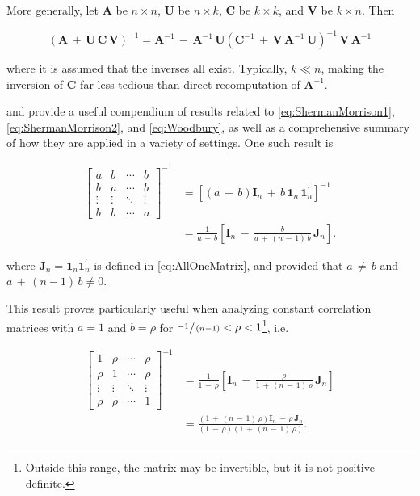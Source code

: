 \documentclass[graybox,envcountchap,sectrefs]{svmono}\usepackage[]{graphicx}\usepackage[]{xcolor}
\begin{document}
\begin{appendices}
More generally, let $\mathbf{A}$ be $n\times n$, $\mathbf{U}$ be
$n\times k$, $\mathbf{C}$ be $k\times k$, and $\mathbf{V}$ be
$k\times n$. Then

\begin{equation}
\left(\mathbf{A}\,+\,\mathbf{U\,\mathbf{C\mathbf{\,V}}}\right)^{-1}=\mathbf{A}^{-1}\,-\,\mathbf{A}^{-1}\,\mathbf{U}\left(\mathbf{C}^{-1}\,+\,\mathbf{V}\,\mathbf{A}^{-1}\,\mathbf{U}\right)^{-1}\,\mathbf{V}\,\mathbf{A}^{-1}\label{eq:Woodbury}
\end{equation}

where it is assumed that the inverses all exist. Typically, $k\ll n$,
making the inversion of $\mathrm{\mathbf{C}}$ far less tedious than
direct recomputation of $\mathbf{A}^{-1}$.

\citet{HendersonSearle1981} and \citet{Hager1989} provide a useful
compendium of results related to \eqref{eq:ShermanMorrison1}, \eqref{eq:ShermanMorrison2},
and \eqref{eq:Woodbury}, as well as a comprehensive summary of how
they are applied in a variety of settings. One such result is

\begin{align}
\left[\begin{array}{cccc}
a & b & \cdots & b\\
b & a & \cdots & b\\
\vdots & \vdots & \ddots & \vdots\\
b & b & \cdots & a
\end{array}\right]^{-1} & =\left[\left(a\,-\,b\right)\mathrm{\mathbf{I}}_{n}\,+\,b\,\mathbf{1}_{n}\,\mathbf{1}_{n}^{\prime}\right]^{-1}\nonumber \\
 & =\frac{1}{a\,-\,b}\left[\mathrm{\mathbf{I}}_{n}\,-\,\frac{b}{a\,+\,\left(n\,-\,1\right)\,b}\,\mathbf{J}_{n}\right].\label{eq:SingleFactorShermanMorrison}
\end{align}

where $\mathbf{J}_{n}=\mathbf{1}_{n}\mathbf{1}_{n}^{\prime}$ is defined
in \eqref{eq:AllOneMatrix}, and provided that $a\,\ne\,b$ and $a\,+\,(n-1)\,b\ne0$. 

This result proves particularly useful when analyzing constant correlation
matrices with $a=1$ and $b=\rho$ for $\nicefrac{-1\,}{\,\left(n-1\right)}<\rho<1$\footnote{Outside this range, the matrix may be invertible, but it is not positive
definite.}, i.e.

\begin{align}
\left[\begin{array}{cccc}
1 & \rho & \cdots & \rho\\
\rho & 1 & \cdots & \rho\\
\vdots & \vdots & \ddots & \vdots\\
\rho & \rho & \cdots & 1
\end{array}\right]^{-1} & =\frac{1}{1\,-\,\rho}\left[\mathrm{\mathbf{I}}_{n}\,-\,\frac{\rho}{1\,+\,\left(n\,-\,1\right)\,\rho}\,\mathbf{J}_{n}\right]\nonumber \\
 & =\frac{\left(1\,+\,\left(n\,-\,1\right)\,\rho\right)\mathrm{\mathbf{I}}_{n}\,-\,\rho\,\mathbf{J}_{n}}{\left(1\,-\,\rho\right)\left(1\,+\,\left(n\,-\,1\right)\,\rho\right)}.\label{eq:ConstantCorrelationShermanMorrison}
\end{align}



\end{appendices}
\end{document}
